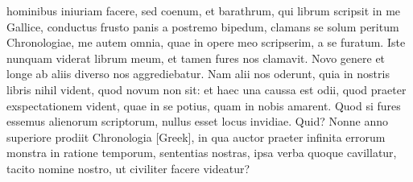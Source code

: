hominibus iniuriam facere, sed coenum, et barathrum, qui librum
scripsit in me Gallice, conductus frusto panis a postremo bipedum,
clamans se solum peritum Chronologiae, me autem omnia, quae
in opere meo scripserim, a se furatum.
Iste nunquam viderat librum
meum, et tamen fures nos clamavit.
Novo genere et longe ab
aliis diverso nos aggrediebatur.
Nam alii nos oderunt, quia in
nostris libris nihil vident, quod novum non sit: et haec una caussa
est odii, quod praeter exspectationem vident, quae in se potius, quam
in nobis amarent.
Quod si fures essemus alienorum scriptorum, nullus
esset locus invidiae.
Quid?
Nonne anno superiore prodiit Chronologia
\textgreek{[Greek]}, in qua auctor praeter infinita errorum monstra
in ratione temporum, sententias nostras, ipsa verba quoque cavillatur,
tacito nomine nostro, ut civiliter facere videatur?


